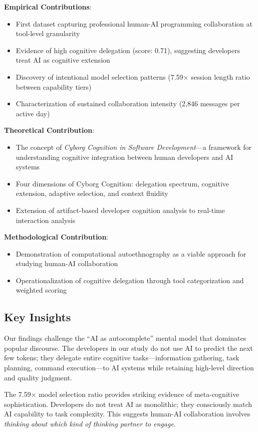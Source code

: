 \documentclass{ntlabs-preprint}
\begin{document}
\textbf{Empirical Contributions}:
\begin{itemize}
    \item First dataset capturing professional human-AI programming collaboration at tool-level granularity
    \item Evidence of high cognitive delegation (score: 0.71), suggesting developers treat AI as cognitive extension
    \item Discovery of intentional model selection patterns (7.59$\times$ session length ratio between capability tiers)
    \item Characterization of sustained collaboration intensity (2,846 messages per active day)
\end{itemize}

\textbf{Theoretical Contribution}:
\begin{itemize}
    \item The concept of \textit{Cyborg Cognition in Software Development}---a framework for understanding cognitive integration between human developers and AI systems
    \item Four dimensions of Cyborg Cognition: delegation spectrum, cognitive extension, adaptive selection, and context fluidity
    \item Extension of artifact-based developer cognition analysis to real-time interaction analysis
\end{itemize}

\textbf{Methodological Contribution}:
\begin{itemize}
    \item Demonstration of computational autoethnography as a viable approach for studying human-AI collaboration
    \item Operationalization of cognitive delegation through tool categorization and weighted scoring
\end{itemize}

\subsection{Key Insights}

Our findings challenge the ``AI as autocomplete'' mental model that dominates popular discourse. The developers in our study do not use AI to predict the next few tokens; they delegate entire cognitive tasks---information gathering, task planning, command execution---to AI systems while retaining high-level direction and quality judgment.

The 7.59$\times$ model selection ratio provides striking evidence of meta-cognitive sophistication. Developers do not treat AI as monolithic; they consciously match AI capability to task complexity. This suggests human-AI collaboration involves \textit{thinking about which kind of thinking partner to engage}.
\end{document}
